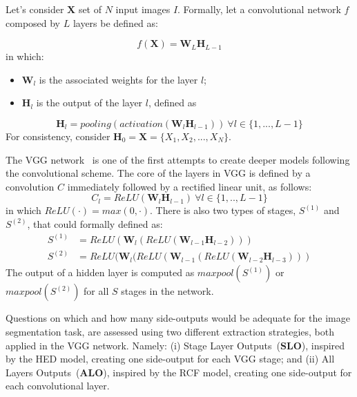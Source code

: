 Let's consider $\mathbf{X}$ set of $N$ input images $I$. Formally, let a convolutional network $\mathit{f}$ composed by $L$ layers be defined as:

 
\begin{equation}
\mathit{f}(\mathbf{X})=\mathbf{W}_L\mathbf{H}_{L-1}
\end{equation}
\noindent in which:
\begin{itemize}
\item $\mathbf{W}_l$ is the associated weights for the layer $l$;
\item $\mathbf{H}_l$ is the output of the layer $l$, defined as
\end{itemize}

\small
\begin{equation}
\mathbf{H}_l= pooling(activation(\mathbf{W}_l\mathbf{H}_{l-1}))~\forall l \in \{1,...,L-1\}
\end{equation}
\normalsize
\noindent For consistency, consider $\mathbf{H}_0=\mathbf{X}=\{X_1, X_2,...,X_N\}$. %

The VGG network~\cite{simonyan2014} is one of the first attempts to create deeper models following the convolutional scheme. The core of the layers in VGG is defined by a convolution $C$ immediately followed by a rectified linear unit, as follows:
 
\begin{equation}
C_l=ReLU(\mathbf{W}_{l}\mathbf{H}_{l-1})~\forall l \in \{1,..,L-1\}
\end{equation}
\noindent in which $ReLU(\cdot)=max(0,\cdot)$. There is also two types of stages, $\mathit{S}^{(1)}$ and $\mathit{S}^{(2)}$, that could formally defined as:
\small
\begin{align}
\mathit{S}^{(1)}&=ReLU(\mathbf{W}_l(ReLU(\mathbf{W}_{l-1}\mathbf{H}_{l-2})))\\
\mathit{S}^{(2)}&=ReLU(\mathbf{W}_l(ReLU(\mathbf{W}_{l-1}(ReLU(\mathbf{W}_{l-2}\mathbf{H}_{l-3})))
\end{align}
\normalsize
\noindent The output of a hidden layer is computed as $maxpool(\mathit{S}^{(1)})$ or $maxpool(\mathit{S}^{(2)})$ for all $S$ stages in the network.

Questions on which and how many side-outputs would be adequate for the image segmentation task, are assessed using two different extraction strategies, both applied in the VGG network. Namely: (i) Stage Layer Outputs~(\textbf{SLO}), inspired by the HED model, creating one side-output for each VGG stage; and (ii) All Layers Outputs~(\textbf{ALO}), inspired by the RCF model, creating one side-output for each convolutional layer. 

